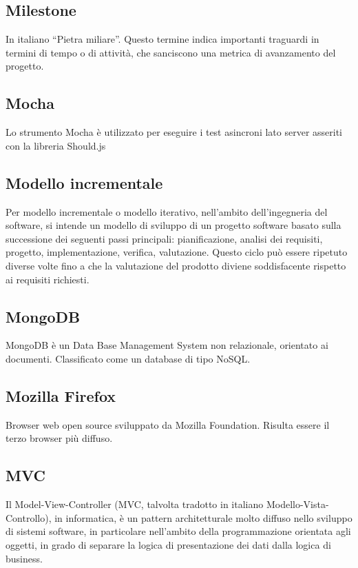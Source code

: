 \subsection{Milestone}
In italiano “Pietra miliare”. Questo termine indica importanti traguardi in termini di
tempo o di attività, che sanciscono una metrica di avanzamento del progetto.

\subsection{Mocha}
Lo strumento Mocha è utilizzato per eseguire i test asincroni lato server asseriti con la libreria
Should.js

\subsection{Modello incrementale}
Per modello incrementale o modello iterativo, nell'ambito dell'ingegneria
del software, si intende un modello di sviluppo di un progetto software basato sulla successione
dei seguenti passi principali: pianificazione, analisi dei requisiti, progetto, implementazione,
verifica, valutazione. Questo ciclo può essere ripetuto diverse volte fino a che la valutazione
del prodotto diviene soddisfacente rispetto ai requisiti richiesti.

\subsection{MongoDB}
MongoDB è un Data Base Management System non relazionale, orientato ai documenti. Classificato come un database di tipo NoSQL.

\subsection{Mozilla Firefox}
Browser web open source sviluppato da Mozilla Foundation. Risulta essere il terzo
browser più diffuso.

\subsection{MVC}
Il Model-View-Controller (MVC, talvolta tradotto in italiano Modello-Vista-Controllo), in informatica, è un pattern architetturale molto diffuso nello sviluppo di sistemi software, in particolare nell'ambito della programmazione orientata agli oggetti, in grado di separare la logica di presentazione dei dati dalla logica di business.

